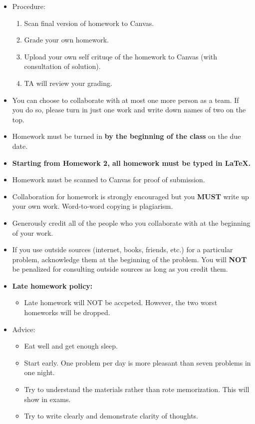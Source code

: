 \documentclass[
]{article}
\providecommand{\tightlist}{%
  \setlength{\itemsep}{0pt}\setlength{\parskip}{0pt}}
\begin{document}
\begin{itemize}
\tightlist
\item
  Procedure:

  \begin{enumerate}
  \def\labelenumi{\arabic{enumi}.}
  \tightlist
  \item
    Scan final version of homework to Canvas.
  \item
    Grade your own homework.
  \item
    Upload your own self crituqe of the homework to Canvas (with consultation of solution).
  \item
    TA will review your grading.
  \end{enumerate}
\item
  You can choose to collaborate with at most one more person as a team. If you do so,
  please turn in just one work and write down names of two on the top.
\item
  Homework must be turned in \textbf{by the beginning of the class} on the due date.
\item
  \textbf{Starting from Homework 2, all homework must be typed in LaTeX.}
\item
  Homework must be scanned to Canvas for proof of submission.
\item
  Collaboration for homework is strongly encouraged but you \textbf{MUST} write up your own work. Word-to-word copying is plagiarism.
\item
  Generously credit all of the people who you collaborate with at the beginning of your work.
\item
  If you use outside sources (internet, books, friends, etc.) for a particular problem, acknowledge them at the beginning of the problem.
  You will \textbf{NOT} be penalized for consulting outside sources as long as you credit them.
\item
  \textbf{Late homework policy:}

  \begin{itemize}
  \tightlist
  \item
    Late homework will NOT be accpeted. However, the two worst homeworks will be dropped.
  \end{itemize}
\item
  Advice:

  \begin{itemize}
  \tightlist
  \item
    Eat well and get enough sleep.
  \item
    Start early. One problem per day is more pleasant than seven problems in one night.
  \item
    Try to understand the materials rather than rote memorization. This will show in exams.
  \item
    Try to write clearly and demonstrate clarity of thoughts.
  \end{itemize}
\end{itemize}
\end{document}
